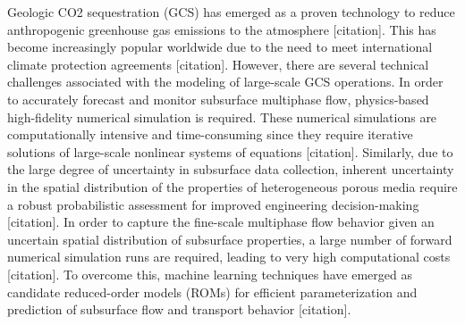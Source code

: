 \documentclass[default,iicol,lineno]{sn-jnl}%
\begin{document}
Geologic CO2 sequestration (GCS) has emerged as a proven technology to reduce anthropogenic greenhouse gas emissions to the atmosphere [citation]. This has become increasingly popular worldwide due to the need to meet international climate protection agreements [citation]. However, there are several technical challenges associated with the modeling of large-scale GCS operations. In order to accurately forecast and monitor subsurface multiphase flow, physics-based high-fidelity numerical simulation is required. These numerical simulations are computationally intensive and time-consuming since they require iterative solutions of large-scale nonlinear systems of equations [citation]. Similarly, due to the large degree of uncertainty in subsurface data collection, inherent uncertainty in the spatial distribution of the properties of heterogeneous porous media require a robust probabilistic assessment for improved engineering decision-making [citation]. In order to capture the fine-scale multiphase flow behavior given an uncertain spatial distribution of subsurface properties, a large number of forward numerical simulation runs are required, leading to very high computational costs [citation]. To overcome this, machine learning techniques have emerged as candidate reduced-order models (ROMs) for efficient parameterization and prediction of subsurface flow and transport behavior [citation].
\end{document}
